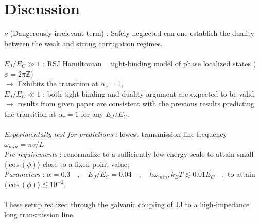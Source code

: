 \documentclass{article}
\begin{document}
\section{Discussion}
$\nu$ (Dangerously irrelevant term)  : Safely neglected can one establish the duality between the weak and strong corrugation regimes.\\
 \\ 
$E_J/E_C \gg 1$ : RSJ Hamiltonian ~ tight-binding model of phase localized states ($\phi=2\pi \mathbb{Z}$)\\
$\rightarrow$ Exhibits the transition at $\alpha_c = 1$,\\
$E_J/E_C \ll 1$ : both tight-binding and duality argument are expected to be valid.\\
$\rightarrow$ results from given paper are consistent with the previous results predicting the transition at $\alpha_c = 1$ for any $E_J/E_C$.\\
 \\
\textit{Experimentally test for predictions} : lowest transmission-line frequency $\omega_{min} = \pi v /L$.\\
\textit{Pre-requirements} : renormalize to a sufficiently low-energy scale to attain small $\langle \cos (\phi) \rangle$ close to a fixed-point value;\\
\textit{Parameters} : $\alpha =0.3\quad,\quad E_J/E_C = 0.04 \quad ,\quad \hbar \omega_{min}, k_B T \lesssim 0.01E_C \quad ,$ to attain $\langle \cos (\phi) \rangle \lesssim 10^{-2}$.
\\
 \\
These setup realized through the galvanic coupling of JJ to a high-impedance long transmission line.
\end{document}
